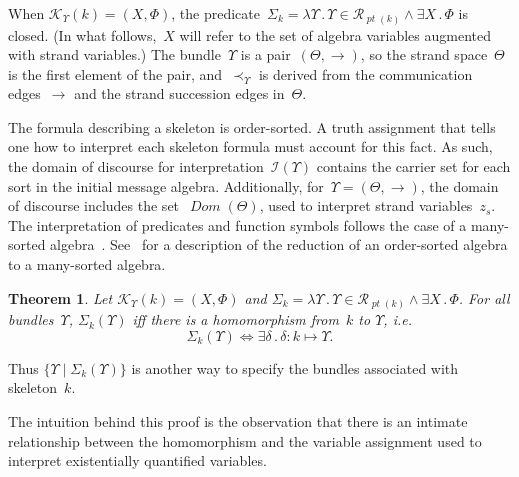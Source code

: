 \documentclass[titlepage,12pt]{article}
\newtheorem{thm}{Theorem}
\newcommand{\fn}[1]{\ensuremath{\operatorname{\mathit{#1}}}}
\newcommand{\typ}{\mathbin:}
\newcommand{\sdom}{\fn{Dom}}
\newcommand{\some}[1]{\exists#1\mathpunct.}
\newcommand{\funct}[1]{\lambda#1\mathpunct.}
\newcommand{\run}{\mathcal{R}}
\newcommand{\pt}{\fn{pt}}
\newcommand{\form}{\mathcal{K}}
\newcommand{\interp}{\mathcal{I}}
\begin{document}
When $\form_\Upsilon(k)=(X,\Phi)$, the
predicate~$\Sigma_k=\funct{\Upsilon}\Upsilon\in\run_{\pt(k)}\land\some{X}\Phi$
is closed.  (In what follows,~$X$ will refer to the set of algebra
variables augmented with strand variables.)  The bundle~$\Upsilon$ is
a pair~$(\Theta,\to)$, so the strand space~$\Theta$ is the first
element of the pair, and~$\prec_\Upsilon$ is derived from the
communication edges~$\to$ and the strand succession edges in~$\Theta$.

The formula describing a skeleton is order-sorted.  A truth assignment
that tells one how to interpret each skeleton formula must account for
this fact.  As such, the domain of discourse for
interpretation~$\interp(\Upsilon)$ contains the
carrier set for each sort in the initial message
algebra.  Additionally, for~$\Upsilon=(\Theta,\to)$, the domain of
discourse includes the set~$\sdom(\Theta)$, used to interpret strand
variables~$z_s$.  The interpretation of predicates and function
symbols follows the case of a many-sorted
algebra~\cite[Section~4.3]{Enderton01}.
See~\cite[Section~4]{GoguenMeseguer92} for a description of the
reduction of an order-sorted algebra to a many-sorted algebra.

\begin{thm}\label{thm:skeleton formula}
Let $\form_\Upsilon(k)=(X,\Phi)$ and
$\Sigma_k=\funct{\Upsilon}\Upsilon\in\run_{\pt(k)}\land\some{X}\Phi$.
For all bundles~$\Upsilon$, $\Sigma_k(\Upsilon)$ iff there is a
homomorphism from~$k$ to $\Upsilon$, i.e.\
$$\Sigma_k(\Upsilon)\Longleftrightarrow
\some{\delta}\delta\typ k\mapsto\Upsilon.$$
\end{thm}

Thus $\{\Upsilon\mid\Sigma_k(\Upsilon)\}$ is another way to
specify the bundles associated with skeleton~$k$.

The intuition behind this proof is the observation that there is an
intimate relationship between the homomorphism and the \index{variable
  assignment}variable assignment used to interpret existentially
quantified variables.
\end{document}
